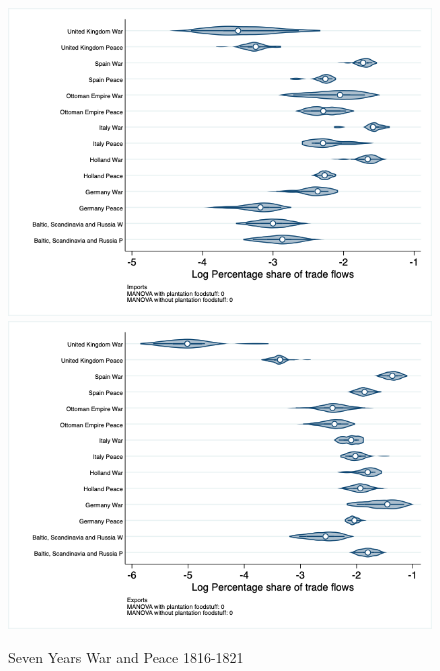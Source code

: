\documentclass[12pt,a4paper,notitlepage,english]{article}
\begin{document}
\begin{figure}
\centering
\caption{Seven Years War and Peace 1816-1821}
\label{seven_peace1764_1777_nat_distr_pays7}
\includegraphics[scale=.4]{seven_peace1764_1777_nat_distr_Ipays7}
\includegraphics[scale=.4]{seven_peace1764_1777_nat_distr_Xpays7}
\end{figure}
\end{document}
